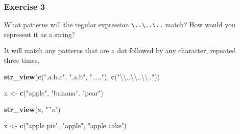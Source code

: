 \documentclass[]{book}
\newenvironment{Shaded}{\begin{snugshade}}{\end{snugshade}}
\newcommand{\CharTok}[1]{\textcolor[rgb]{0.31,0.60,0.02}{#1}}
\newcommand{\KeywordTok}[1]{\textcolor[rgb]{0.13,0.29,0.53}{\textbf{#1}}}
\newcommand{\NormalTok}[1]{#1}
\newcommand{\StringTok}[1]{\textcolor[rgb]{0.31,0.60,0.02}{#1}}
\theoremstyle{definition}
\theoremstyle{definition}
\theoremstyle{definition}
\theoremstyle{remark}
\begin{document}
\hypertarget{exercise-3-22}{%
\subsubsection{Exercise 3}\label{exercise-3-22}}

What patterns will the regular expression
\texttt{\textbackslash{}..\textbackslash{}..\textbackslash{}..} match?
How would you represent it as a string?

It will match any patterns that are a dot followed by any character,
repeated three times.

\begin{Shaded}
\begin{Highlighting}[]
\KeywordTok{str_view}\NormalTok{(}\KeywordTok{c}\NormalTok{(}\StringTok{".a.b.c"}\NormalTok{, }\StringTok{".a.b"}\NormalTok{, }\StringTok{"....."}\NormalTok{), }\KeywordTok{c}\NormalTok{(}\StringTok{"}\CharTok{\textbackslash{}\textbackslash{}}\StringTok{..}\CharTok{\textbackslash{}\textbackslash{}}\StringTok{..}\CharTok{\textbackslash{}\textbackslash{}}\StringTok{.."}\NormalTok{))}
\end{Highlighting}
\end{Shaded}

\begin{Shaded}
\begin{Highlighting}[]
\NormalTok{x <-}\StringTok{ }\KeywordTok{c}\NormalTok{(}\StringTok{"apple"}\NormalTok{, }\StringTok{"banana"}\NormalTok{, }\StringTok{"pear"}\NormalTok{)}
\end{Highlighting}
\end{Shaded}

\begin{Shaded}
\begin{Highlighting}[]
\KeywordTok{str_view}\NormalTok{(x, }\StringTok{"^a"}\NormalTok{)}
\end{Highlighting}
\end{Shaded}

\begin{Shaded}
\end{Shaded}

\begin{Shaded}
\begin{Highlighting}[]
\NormalTok{x <-}\StringTok{ }\KeywordTok{c}\NormalTok{(}\StringTok{"apple pie"}\NormalTok{, }\StringTok{"apple"}\NormalTok{, }\StringTok{"apple cake"}\NormalTok{)}
\end{Highlighting}
\end{Shaded}
\end{document}
